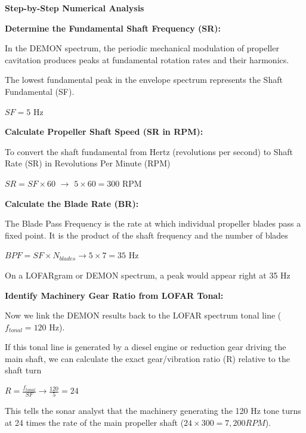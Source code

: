 \textbf{Step-by-Step Numerical Analysis}
\begin{compactenum}
    \item \textbf{Determine the Fundamental Shaft Frequency (SR):}
        \begin{compactenum}[i]
            \item In the DEMON spectrum, the periodic mechanical modulation of propeller cavitation produces peaks at fundamental rotation rates and their harmonics.
            \item The lowest fundamental peak in the envelope spectrum represents the Shaft Fundamental (SF).
            \item $SF = 5$ Hz
        \end{compactenum}
    \item \textbf{Calculate Propeller Shaft Speed (SR in RPM):}
        \begin{compactenum}[i]
            \item To convert the shaft fundamental from Hertz (revolutions per second) to Shaft Rate (SR) in Revolutions Per Minute (RPM)
            \item $SR = SF \times 60$ $\rightarrow$  $5 \times 60 = 300$ RPM
        \end{compactenum}
    \item \textbf{Calculate the Blade Rate (BR):}
        \begin{compactenum}[i]
            \item The Blade Pass Frequency is the rate at which individual propeller blades pass a fixed point. It is the product of the shaft frequency and the number of blades
            \item $BPF=SF \times N_{blades} \rightarrow 5 \times 7 = 35$ Hz
            \item On a LOFARgram or DEMON spectrum, a peak would appear right at 35 Hz
        \end{compactenum}
    \item \textbf{Identify Machinery Gear Ratio from LOFAR Tonal:}
        \begin{compactenum}[i]
            \item Now we link the DEMON results back to the LOFAR spectrum tonal line ($f_{tonal} = 120$ Hz).
            \item If this tonal line is generated by a diesel engine or reduction gear driving the main shaft, we can calculate the exact gear/vibration ratio (R) relative to the shaft turn
            \item $R = \frac{f_{tonal}}{SF} \rightarrow \frac{120}{5} = 24$
            \item This tells the sonar analyst that the machinery generating the 120 Hz tone turns at 24 times the rate of the main propeller shaft ($24 \times 300 = 7,200 RPM$).
        \end{compactenum}
\end{compactenum}


